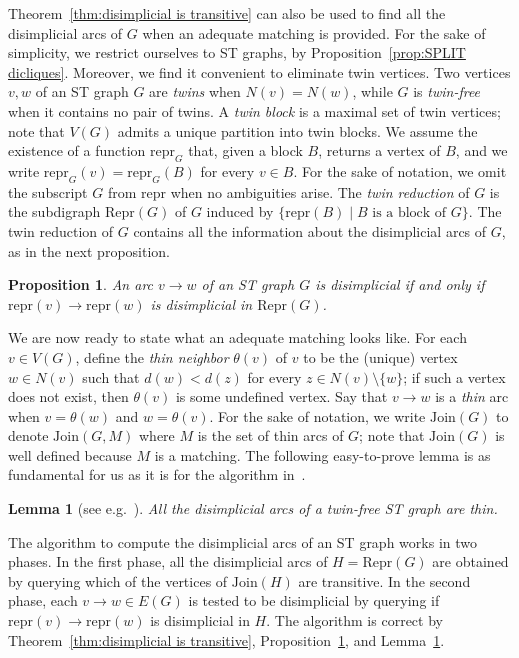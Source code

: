 \documentclass[a4paper,11pt]{article}
\newtheorem{lemma}[theorem]{Lemma}
\newtheorem{proposition}[theorem]{Proposition}
\newcommand{\JOIN}{\ensuremath{\mathrm{Join}}}
\newcommand{\REPG}{\ensuremath{\mathrm{Repr}}}
\newcommand{\TN}{\ensuremath{\theta}}
\newcommand{\REP}{\ensuremath{\mathrm{repr}}}
\begin{document}
Theorem~\ref{thm:disimplicial is transitive} can also be used to find all the disimplicial arcs of $G$ when an adequate matching is provided.  For the sake of simplicity, we restrict ourselves to ST graphs, by Proposition~\ref{prop:SPLIT dicliques}.  Moreover, we find it convenient to eliminate twin vertices.  Two vertices $v,w$ of an ST graph $G$ are \emph{twins} when $N(v) = N(w)$, while $G$ is \emph{twin-free} when it contains no pair of twins.  A \emph{twin block} is a maximal set of twin vertices; note that $V(G)$ admits a unique partition into twin blocks.  We assume the existence of a function $\REP_G$ that, given a block $B$, returns a vertex of $B$, and we write $\REP_G(v) = \REP_G(B)$ for every $v \in B$.  For the sake of notation, we omit the subscript $G$ from $\REP$ when no ambiguities arise.  The \emph{twin reduction} of $G$ is the subdigraph $\REPG(G)$ of $G$ induced by $\{\REP(B) \mid B \text{ is a block of } G\}$.  The twin reduction of $G$ contains all the information about the disimplicial arcs of $G$, as in the next proposition.

\begin{proposition}\label{prop:twin reduction}
  An arc $v \to w$ of an ST graph $G$ is disimplicial if and only if\/ $\REP(v) \to \REP(w)$ is disimplicial in $\REPG(G)$. 
\end{proposition}

We are now ready to state what an adequate matching looks like.  For each $v \in V(G)$, define the \emph{thin neighbor} $\TN(v)$ of $v$ to be the (unique) vertex $w \in N(v)$ such that $d(w) < d(z)$ for every $z \in N(v) \setminus \{w\}$; if such a vertex does not exist, then $\TN(v)$ is some undefined vertex.  Say that $v \to w$ is a \emph{thin} arc when $v = \TN(w)$ and $w = \TN(v)$.  For the sake of notation, we write $\JOIN(G)$ to denote $\JOIN(G, M)$ where $M$ is the set of thin arcs of $G$; note that $\JOIN(G)$ is well defined because $M$ is a matching. The following easy-to-prove lemma is as fundamental for us as it is for the algorithm in~\cite{BomhoffMantheyDAM2013}.

\begin{lemma}[see e.g.~\cite{BomhoffMantheyDAM2013}]\label{lem:disimplicial is thin}
  All the disimplicial arcs of a twin-free ST graph are thin. 
\end{lemma}

The algorithm to compute the disimplicial arcs of an ST graph works in two phases.  In the first phase, all the disimplicial arcs of $H = \REPG(G)$ are obtained by querying which of the vertices of $\JOIN(H)$ are transitive.  In the second phase, each $v \to w \in E(G)$ is tested to be disimplicial by querying if $\REP(v) \to \REP(w)$ is disimplicial in $H$.   The algorithm is correct by Theorem~\ref{thm:disimplicial is transitive}, Proposition~\ref{prop:twin reduction}, and Lemma~\ref{lem:disimplicial is thin}.  
\end{document}
